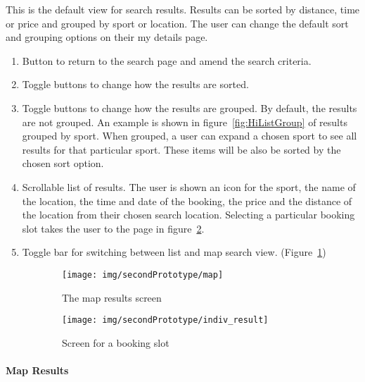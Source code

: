 This is the default view for search results. Results can be sorted
by distance, time or price and grouped by sport or location. The user
can change the default sort and grouping options on their my details
page.
\begin{enumerate}
	\item Button to return to the search page and amend the search criteria.
	\item Toggle buttons to change how the results are sorted.
	\item Toggle buttons to change how the results are grouped. By default,
	      the results are not grouped. An example is shown in figure~\ref{fig:HiListGroup}
	      of results grouped by sport. When grouped, a user can expand a chosen
	      sport to see all results for that particular sport. These items will
	      be also be sorted by the chosen sort option.
	\item Scrollable list of results. The user is shown an icon for the sport,
	      the name of the location, the time and date of the booking, the price
	      and the distance of the location from their chosen search location.
	      Selecting a particular booking slot takes the user to the page in
	      figure~\ref{fig:HiIndResult}.
	\item Toggle bar for switching between list and map search view. (Figure~\ref{fig:HiMap})
\end{enumerate}

\begin{figure}[htbp] 	
	\centering 	
	\begin{subfigure}[b]{0.45\textwidth} 		
		\texttt{[image: img/secondPrototype/map]} 		
		\caption{The map results screen}\label{fig:HiMap}
	\end{subfigure}%
	\qquad 	
	\begin{subfigure}[b]{0.45\textwidth} 		
		\texttt{[image: img/secondPrototype/indiv\_result]} 		
		\caption{Screen for a booking slot}\label{fig:HiIndResult}
	\end{subfigure} 	
	\caption{}\label{fig:MapResult} 
\end{figure}


\paragraph{Map Results}

